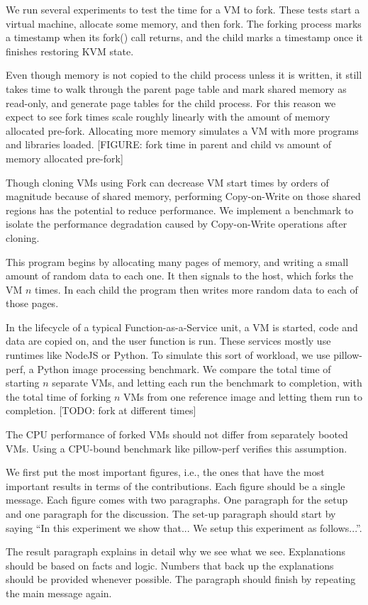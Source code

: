  We run several experiments to test the time for a VM to fork. These tests start a virtual machine, allocate some memory, and then fork. The forking process marks a timestamp when its fork() call returns, and the child marks a timestamp once it finishes restoring KVM state.

Even though memory is not copied to the child process unless it is written, it still takes time to walk through the parent page table and mark shared memory as read-only, and generate page tables for the child process. For this reason we expect to see fork times scale roughly linearly with the amount of memory allocated pre-fork. Allocating more memory simulates a VM with more programs and libraries loaded. [FIGURE: fork time in parent and child vs amount of memory allocated pre-fork]

 Though cloning VMs using Fork can decrease VM start times by orders of magnitude because of shared memory, performing Copy-on-Write on those shared regions has the potential to reduce performance. We implement a benchmark to isolate the performance degradation caused by Copy-on-Write operations after cloning.

This program begins by allocating many pages of memory, and writing a small amount of random data to each one. It then signals to the host, which forks the VM $n$ times. In each child the program then writes more random data to each of those pages.

 In the lifecycle of a typical Function-as-a-Service unit, a VM is started, code and data are copied on, and the user function is run. These services mostly use runtimes like NodeJS or Python. To simulate this sort of workload, we use pillow-perf, a Python image processing benchmark. We compare the total time of starting $n$ separate VMs, and letting each run the benchmark to completion, with the total time of forking $n$ VMs from one reference image and letting them run to completion. [TODO: fork at different times]

The CPU performance of forked VMs should not differ from separately booted VMs. Using a CPU-bound benchmark like pillow-perf verifies this assumption.

We first put the most important figures, i.e., the
ones that have the most important results in terms
of the contributions. Each figure should be a
single message. Each figure comes with two
paragraphs. One paragraph for the setup and one
paragraph for the discussion. The set-up paragraph
should start by saying ``In this experiment we
show that... We setup this experiment as follows...''.

The result paragraph explains in detail why we see
what we see. Explanations should be based on facts
and logic. Numbers that back up the explanations
should be provided whenever possible. The
paragraph should finish by repeating the main
message again.

